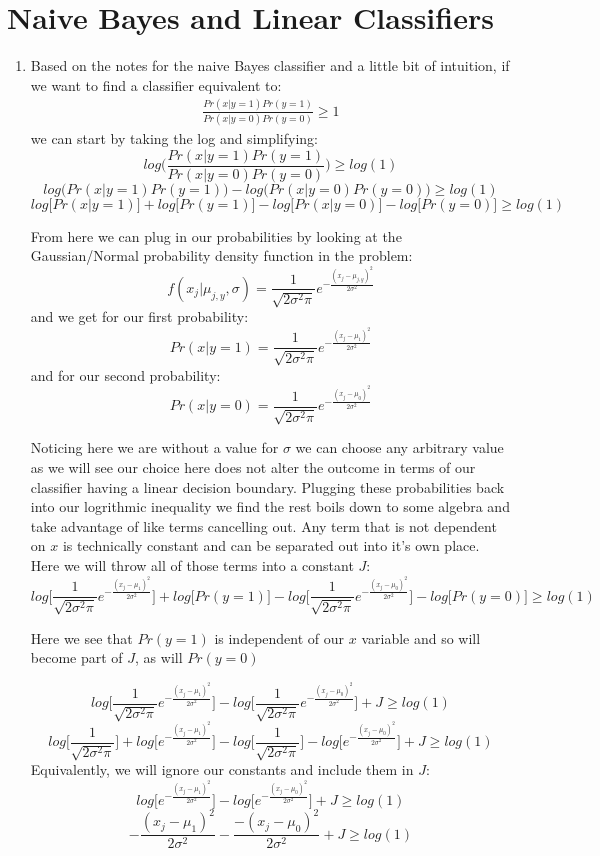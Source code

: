 \documentclass[11pt,a4paper]{article}
\begin{document}
	\section{Naive Bayes and Linear Classifiers}
		\begin{enumerate}
			\item Based on the notes for the naive Bayes classifier and a little bit of intuition, if we want to find a classifier equivalent to: 
			\begin{align*}
				\frac{Pr(x\vert y=1)Pr(y=1)}{Pr(x\vert y=0)Pr(y=0)}\geq 1
			\end{align*}					
			we can start by taking the log and simplifying:
			$$log\Big(\frac{Pr(x\vert y=1)Pr(y=1)}{Pr(x\vert y=0)Pr(y=0)}\Big) \geq log(1)$$
			$$log\big(Pr(x\vert y=1)Pr(y=1)\big)-log\big({Pr(x\vert y=0)Pr(y=0)}\big) \geq log(1)$$
			$$log\big[Pr(x\vert y=1)\big]+log\big[Pr(y=1)\big]-log\big[Pr(x\vert y=0)\big]-log\big[Pr(y=0)\big] \geq log(1)$$
			
			From here we can plug in our probabilities by looking at the Gaussian/Normal probability density function in the problem:
			$$f(x_j\vert \mu_{j,y},\sigma) = \frac{1}{\sqrt{2 \sigma^2 \pi}}e^{-\frac{(x_j-\mu_{j,y})^2}{2\sigma^2}}$$
			 and we get for our first probability:
			 $$Pr(x \vert y=1) = \frac{1}{\sqrt{2 \sigma^2 \pi}}e^{-\frac{(x_j-\mu_{1})^2}{2\sigma^2}}$$
			 and for our second probability:
			 $$Pr(x \vert y=0) = \frac{1}{\sqrt{2 \sigma^2 \pi}}e^{-\frac{(x_j-\mu_{0})^2}{2\sigma^2}}$$
			 
			 Noticing here we are without a value for $\sigma$ we can choose any arbitrary value as we will see our choice here does not alter the outcome in terms of our classifier having a linear decision boundary. Plugging these probabilities back into our logrithmic inequality we find the rest boils down to some algebra and take advantage of like terms cancelling out. Any term that is not dependent on $x$ is technically constant and can be separated out into it's own place. Here we will throw all of those terms into a constant $J$:
			 $$log\big[\frac{1}{\sqrt{2 \sigma^2 \pi}}e^{-\frac{(x_j-\mu_{1})^2}{2\sigma^2}}\big]+log\big[Pr(y=1)\big]-log\big[\frac{1}{\sqrt{2 \sigma^2 \pi}}e^{-\frac{(x_j-\mu_{0})^2}{2\sigma^2}}\big]-log\big[Pr(y=0)\big] \geq log(1)$$
			 
			 Here we see that $Pr(y=1)$ is independent of our $x$ variable and so will become part of $J$, as will $Pr(y=0)$
			 
			  $$log\big[\frac{1}{\sqrt{2 \sigma^2 \pi}}e^{-\frac{(x_j-\mu_{1})^2}{2\sigma^2}}\big]-log\big[\frac{1}{\sqrt{2 \sigma^2 \pi}}e^{-\frac{(x_j-\mu_{0})^2}{2\sigma^2}}\big]+J \geq log(1)$$
			  $$log\big[\frac{1}{\sqrt{2 \sigma^2 \pi}}\big]+log\big[e^{-\frac{(x_j-\mu_{1})^2}{2\sigma^2}}\big]-log\big[\frac{1}{\sqrt{2 \sigma^2 \pi}}\big]-log\big[e^{-\frac{(x_j-\mu_{0})^2}{2\sigma^2}}\big]+J \geq log(1)$$
			  Equivalently, we will ignore our constants and include them in $J$:
			  $$log\big[e^{-\frac{(x_j-\mu_{1})^2}{2\sigma^2}}\big]-log\big[e^{-\frac{(x_j-\mu_{0})^2}{2\sigma^2}}\big]+J \geq log(1)$$
			  $$-\frac{(x_j-\mu_{1})^2}{2\sigma^2}-\frac{-(x_j-\mu_{0})^2}{2\sigma^2}+J \geq log(1)$$
			  

\end{enumerate}
\end{document}

